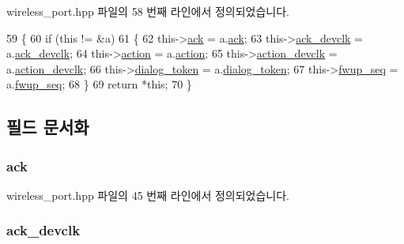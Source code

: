 wireless\+\_\+port.\+hpp 파일의 58 번째 라인에서 정의되었습니다.


\begin{DoxyCode}
59     \{
60         \textcolor{keywordflow}{if} (\textcolor{keyword}{this} != &a)
61         \{
62             this->\hyperlink{class_wireless_dialog_aba9c6cf90be4c737103f37ae82aa9cd0}{ack} = a.\hyperlink{class_wireless_dialog_aba9c6cf90be4c737103f37ae82aa9cd0}{ack};
63             this->\hyperlink{class_wireless_dialog_a0d8bfa01dba56ce17e8d98de7c99fd0a}{ack\_devclk} = a.\hyperlink{class_wireless_dialog_a0d8bfa01dba56ce17e8d98de7c99fd0a}{ack\_devclk};
64             this->\hyperlink{class_wireless_dialog_ad462f9a02358b1e73c51bca4328b8e21}{action} = a.\hyperlink{class_wireless_dialog_ad462f9a02358b1e73c51bca4328b8e21}{action};
65             this->\hyperlink{class_wireless_dialog_a6694b46dc5b3e07f3e7fb085db34c24b}{action\_devclk} = a.\hyperlink{class_wireless_dialog_a6694b46dc5b3e07f3e7fb085db34c24b}{action\_devclk};
66             this->\hyperlink{class_wireless_dialog_af4c116e249b109ded342c6ae740980ef}{dialog\_token} = a.\hyperlink{class_wireless_dialog_af4c116e249b109ded342c6ae740980ef}{dialog\_token};
67             this->\hyperlink{class_wireless_dialog_a2643314d71609e165f5c5b2024fa6e96}{fwup\_seq} = a.\hyperlink{class_wireless_dialog_a2643314d71609e165f5c5b2024fa6e96}{fwup\_seq};
68         \}
69         \textcolor{keywordflow}{return} *\textcolor{keyword}{this};
70     \}
\end{DoxyCode}


\subsection{필드 문서화}
\subsubsection[{\texorpdfstring{ack}{ack}}]{ ack}\hypertarget{class_wireless_dialog_aba9c6cf90be4c737103f37ae82aa9cd0}{}\label{class_wireless_dialog_aba9c6cf90be4c737103f37ae82aa9cd0}


wireless\+\_\+port.\+hpp 파일의 45 번째 라인에서 정의되었습니다.

\subsubsection[{\texorpdfstring{ack\+\_\+devclk}{ack_devclk}}]{ ack\+\_\+devclk}\hypertarget{class_wireless_dialog_a0d8bfa01dba56ce17e8d98de7c99fd0a}{}\label{class_wireless_dialog_a0d8bfa01dba56ce17e8d98de7c99fd0a}


